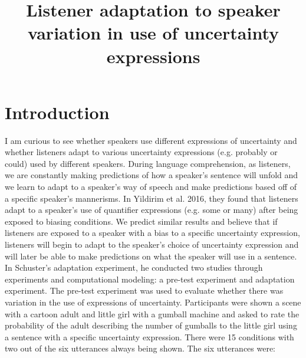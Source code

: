 \documentclass{sp}          %
\title{Listener adaptation to speaker variation in use of uncertainty expressions}
\author{%
  \spauthor{Replication of adaptation experiment by Sebastian Schuster and Judith Degen
  Aleeza Yu\\ \today}
}
\begin{document}

\maketitle





\section{Introduction}

I am curious to see whether speakers use different expressions of uncertainty and whether listeners adapt to various uncertainty expressions (e.g. probably or could) used by different speakers. During language comprehension, as listeners, we are constantly making predictions of how a speaker’s sentence will unfold and we learn to adapt to a speaker’s way of speech and make predictions based off of a specific speaker’s mannerisms. In Yildirim et al. 2016, they found that listeners adapt to a speaker’s use of quantifier expressions (e.g. some or many) after being exposed to biasing conditions. We predict similar results and believe that if listeners are exposed to a speaker with a bias to a specific uncertainty expression, listeners will begin to adapt to the speaker’s choice of uncertainty expression and will later be able to make predictions on what the speaker will use in a sentence.
In Schuster’s adaptation experiment, he conducted two studies through experiments and computational modeling: a pre-test experiment and adaptation experiment. The pre-test experiment was used to evaluate whether there was variation in the use of expressions of uncertainty. Participants were shown a scene with a cartoon adult and little girl with a gumball machine and asked to rate the probability of the adult describing the number of gumballs to the little girl using a sentence with a specific uncertainty expression. There were 15 conditions with two out of the six utterances always being shown. The six utterances were: 
\end{document}
